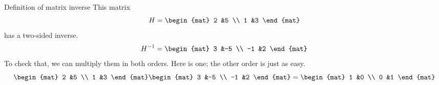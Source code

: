 \documentclass[10pt,t]{beamer}
\begin{document}
\begin{frame}{Definition of matrix inverse}
\df[df:MatrixInverse]
\pause
\ex
This matrix 
\begin{equation*}
  H=
  \begin{mat}
    2  &5  \\
    1  &3
  \end{mat}
\end{equation*}
has a two-sided inverse.
\begin{equation*}
  H^{-1}=
  \begin{mat}
    3   &-5  \\
    -1  &2
  \end{mat}
\end{equation*}
To check that, we can multiply them in both orders.  
Here is one; the other order is just as easy.
\begin{equation*}
  \begin{mat}
    2  &5  \\
    1  &3
  \end{mat}
  \begin{mat}
    3   &-5  \\
    -1  &2
  \end{mat}
  =
  \begin{mat}
    1  &0  \\
    0  &1
  \end{mat}
\end{equation*}
\end{frame}
\end{document}
